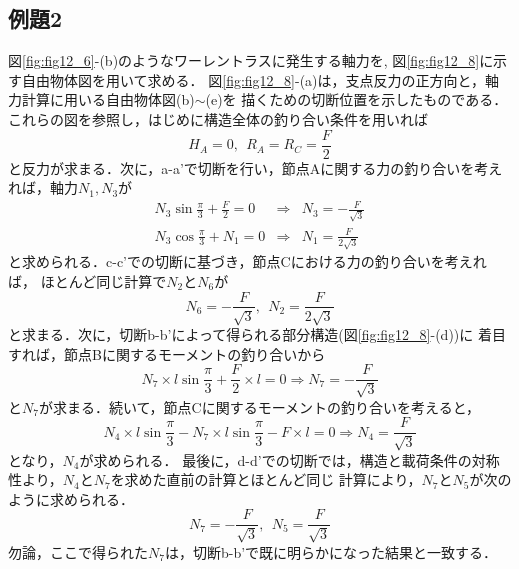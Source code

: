 \documentclass[10pt,a4j]{jarticle}
\begin{document}
\subsection{例題2}
図\ref{fig:fig12_6}-(b)のようなワーレントラスに発生する軸力を, 
図\ref{fig:fig12_8}に示す自由物体図を用いて求める．
図\ref{fig:fig12_8}-(a)は，支点反力の正方向と，軸力計算に用いる自由物体図(b)$\sim$(e)を
描くための切断位置を示したものである．
これらの図を参照し，はじめに構造全体の釣り合い条件を用いれば
\begin{equation}
	H_A=0, \ \ R_A=R_C=\frac{F}{2}
\end{equation}
と反力が求まる．次に，a-a'で切断を行い，節点Aに関する力の釣り合いを考えれば，軸力$N_1,N_3$が
\begin{eqnarray}
	N_3\sin\frac{\pi}{3}+\frac{F}{2}=0 
	&\Rightarrow  & 
	N_3=-\frac{F}{\sqrt{3}} \\
	N_3\cos\frac{\pi}{3}+N_1=0
	&\Rightarrow  & 
	N_1=\frac{F}{2\sqrt{3}} 
\end{eqnarray}
と求められる．c-c'での切断に基づき，節点Cにおける力の釣り合いを考えれば，
ほとんど同じ計算で$N_2$と$N_6$が
\begin{equation}
	N_6=-\frac{F}{\sqrt{3}}, \ \ N_2=\frac{F}{2\sqrt{3}} 
	\label{eqn:}
\end{equation}
と求まる．次に，切断b-b'によって得られる部分構造(図\ref{fig:fig12_8}-(d))に
着目すれば，節点Bに関するモーメントの釣り合いから
\begin{equation}
	N_7 \times l\sin\frac{\pi}{3}+\frac{F}{2}\times l =0 \Rightarrow 
	N_7=-\frac{F}{\sqrt{3}}
\end{equation}
と$N_7$が求まる．続いて，節点Cに関するモーメントの釣り合いを考えると，
\begin{equation}
	N_4 \times l\sin\frac{\pi}{3}- N_7 \times l\sin\frac{\pi}{3} - F\times l =0 \Rightarrow 
	N_4=\frac{F}{\sqrt{3}}
\end{equation}
となり，$N_4$が求められる．
最後に，d-d'での切断では，構造と載荷条件の対称性より，$N_4$と$N_7$を求めた直前の計算とほとんど同じ
計算により，$N_7$と$N_5$が次のように求められる．
\begin{equation}
	N_7=-\frac{F}{\sqrt{3}}
	, \ \ 
	N_5=\frac{F}{\sqrt{3}}
	\label{eqn:}
\end{equation}
勿論，ここで得られた$N_7$は，切断b-b'で既に明らかになった結果と一致する．\\
\end{document}
